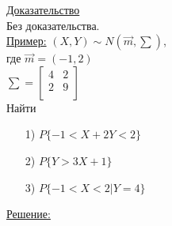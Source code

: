 \underline{Доказательство}\\
Без доказательства.\\


\underline{Пример:} 
$(X, Y) \sim N (\vec{m}, \sum)$,\\ 
где $\vec{m} = (-1, 2)$\\
$\sum = 
\begin{bmatrix}
	4	&	2	\\
	2	&	9	\\
\end{bmatrix}$\\
Найти\\
\begin{enumerate}
	\item[1)]	$P\{-1 < X + 2Y < 2\}$
	\item[2)]	$P\{Y > 3X + 1\}$
	\item[3)]	$P\{-1 < X < 2|Y = 4\}$
\end{enumerate}
\underline{Решение:}\\
